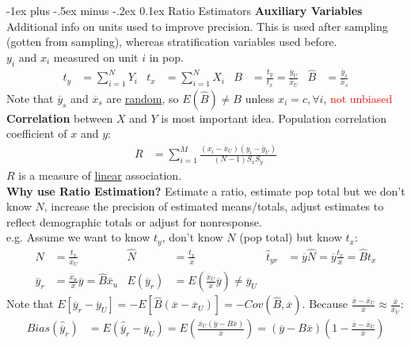 \documentclass[landscape]{article}
\makeatletter
\renewcommand{\section}{\@startsection{section}{1}{0mm}%
                                {-1ex plus -.5ex minus -.2ex}%
                                {0.1ex}%
                                {\color{blue}\normalfont\large\bfseries}}
\makeatother
\begin{document}
\begin{multicols*}{3}
\section{Ratio Estimators}
\textbf{Auxiliary Variables} Additional info on units used to
improve precision. This is used after sampling (gotten from sampling),
whereas stratification variables used before.
\\ $y_i$ and $x_i$ measured on unit $i$ in pop.
\begin{align*}
  t_y & = \sum_{i=1}^N Y_i
  & t_x & = \sum_{i=1}^N X_i
  & B & = \frac{t_y}{t_x} = \frac{\overline{y}_U}{\overline{x}_U}
  & \hat{B} & = \frac{\overline{y}_s}{\overline{x}_s}
\end{align*}
Note that $\overline{y}_s$ and $\overline{x}_s$ are
\underline{random}, so $E(\hat{B}) \neq B$ unless $x_i = c, \forall
i$, \textcolor{red}{not unbiased}
\\ \textbf{Correlation} between $X$ and $Y$ is most important
idea. Population correlation coefficient of $x$ and $y$:
\begin{align*}
  R & = \sum_{i = 1}^M \frac{(x_i - \overline{x}_U)(y_i - \overline{y}_U)}{(N-1)S_xS_y}
\end{align*}
$R$ is a measure of \underline{linear} association.
\\\textbf{Why use Ratio Estimation?} Estimate a ratio, estimate pop
total but we don't know $N$, increase the precision of estimated
means/totals, adjust estimates to reflect demographic totals or adjust
for nonresponse.
\\ e.g. Assume we want to know $t_y$, don't know $N$ (pop total) but know $t_x$:
\begin{align*}
  N & = \frac{t_x}{\overline{x}_U}& \hat{N}& = \frac{t_x}{\overline{x}}
  & \hat{t}_{yr} & = \overline{y}\hat{N} = \overline{y} \frac{t_x}{\overline{x}} = \hat{B} t_x
  \\ \hat{\overline{y}}_r & = \frac{\overline{x}_u}{\overline{x}} \overline{y} = \hat{B} \overline{x}_u
  & E(\overline{y}_r) & = E \left(\frac{\overline{x}_U}{\overline{x}} \overline{y}\right) \neq \overline{y}_U
\end{align*}
Note that $E[\overline{y}_r - \overline{y}_U] =
-E[\hat{B}(\overline{x} - \overline{x}_U)] = -Cov(\hat{B},
\overline{x})$. Because
$\frac{\overline{x}-\overline{x}_U}{\overline{x}} \approx \frac{\overline{x}}{\overline{x}_U}$:
\begin{align*}
  Bias(\hat{\overline{y}}_r) & = E(\hat{\overline{y}}_r - \overline{y}_U)
                               = E \left(\frac{\overline{x}_U (\overline{y}-B \overline{x})}{\overline{x}}\right) = (\overline{y}-B \overline{x}) \left(1 - \frac{\overline{x} - \overline{x}_U}{\overline{x}}\right)

\end{align*}
\end{multicols*}
\end{document}
